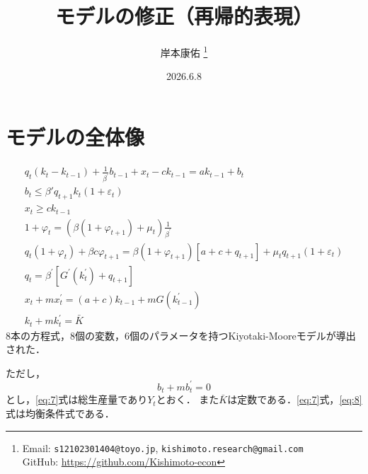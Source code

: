 \documentclass[dvipdfmx]{jlreq}
\title{
\vspace{-3cm}
モデルの修正（再帰的表現）
}
\author{
  岸本康佑
  \thanks{
  Email: \texttt{s12102301404@toyo.jp}, \texttt{kishimoto.research@gmail.com} \\
  GitHub: \url{https://github.com/Kishimoto-econ}
}}
\date{2026.6.8}
\begin{document}
\maketitle
\tableofcontents

\section{モデルの全体像}
\begin{gather}
  q_t(k_t - k_{t-1}) + \frac{1}{\beta^\prime} b_{t-1} + x_t - c k_{t-1} = a k_{t-1} + b_t \label{eq:1} \\
  b_t \leq \beta\prime q_{t+1} k_t (1+\varepsilon_t) \label{eq:2} \\
  x_t \geq c k_{t-1} \label{eq:3} \\
  1 + \varphi_t = (\beta(1+\varphi_{t+1}) + \mu_t) \frac{1}{\beta^\prime} \label{eq:4} \\
  q_t (1 + \varphi_t) + \beta c \varphi_{t+1} = \beta (1 + \varphi_{t+1})[a + c + q_{t+1}] + \mu_t q_{t+1} (1+\varepsilon_t) \label{eq:5} \\
  q_t = \beta^\prime [G^\prime(k^\prime_t) + q_{t+1}] \label{eq:6} \\
  x_t + m x^\prime_t = (a + c) k_{t-1} + m G(k^\prime_{t-1}) \label{eq:7} \\
  k_t + m k^\prime_t = \bar{K} \label{eq:8}
\end{gather}
8本の方程式，8個の変数，6個のパラメータを持つKiyotaki-Mooreモデルが導出された．

ただし，
\begin{equation}
  b_t + m b^\prime_t = 0
\end{equation}
とし，\eqref{eq:7}式は総生産量であり$Y_t$とおく．
また$\bar{K}$は定数である．\eqref{eq:7}式，\eqref{eq:8}式は均衡条件式である．
\end{document}
